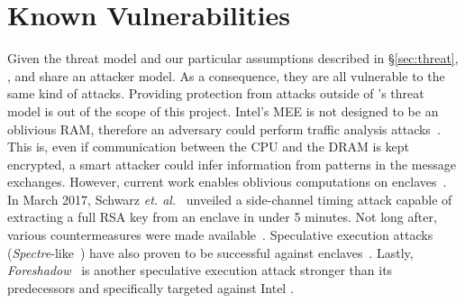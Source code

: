 \section{Known Vulnerabilities} \label{sec:vulnerabilities}

Given the threat model and our particular assumptions described in \S\ref{sec:threat}, \projName, \sgxspark and \sgx share an attacker model.
As a consequence, they are all vulnerable to the same kind of attacks.
Providing protection from attacks outside of \sgx's threat model is out of the scope of this project.
Intel's MEE is not designed to be an oblivious RAM, therefore an adversary could perform traffic analysis attacks~\cite{Gueron16}.
This is, even if communication between the CPU and the DRAM is kept encrypted, a smart attacker could infer information from patterns in the message exchanges.
However, current work enables oblivious computations on enclaves~\cite{Zheng2017}. 
In March 2017, Schwarz \textit{et. al.}~\cite{Schwarz2017} unveiled a side-channel timing attack capable of extracting a full RSA key from an enclave in under 5 minutes.  
Not long after, various countermeasures were made available~\cite{Brasser2017,Gruss2017}.
Speculative execution attacks (\textit{Spectre}-like~\cite{Kocher2018}) have also proven to be successful against enclaves~\cite{sgx-spectre}. 
Lastly, \textit{Foreshadow}~\cite{VanBulck2018} is another speculative execution attack stronger than its predecessors and specifically targeted against Intel \sgx.
